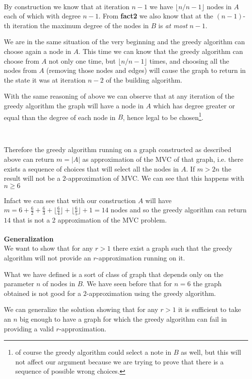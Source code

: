 \documentclass[a4paper]{article}
\begin{document}
\

By construction we know that at iteration $n-1$ we have $\lfloor n/n-1 \rfloor$ nodes in $A$ each of which with degree $n-1$.
From \textbf{fact2} we also know that at the $(n-1)$-th iteration the maximum degree of the nodes in $B$  is \emph{at most} $n-1$.

We are in the same situation of the very beginning and the greedy algorithm can choose again a node in $A$.
This time we can know that the greedy algorithm can choose from $A$ not only one time, but $\lfloor n/n-1 \rfloor$ times, and choosing all the nodes from $A$ (removing those nodes and edges) will cause the graph to return in the state it was at iteration $n-2$ of the building algorithm.

With the same reasoning of above we can observe that at any iteration of the greedy algorithm the graph will have a node in $A$ which has degree greater or equal than the degree of each node in $B$, hence legal to be chosen\footnote{of course the greedy algorithm could select a note in $B$ as well, but this will not affect our argument because we are trying to prove that there is a sequence of possible wrong choices.}.

\

Therefore the greedy algorithm running on a graph constructed as described above can return $m = |A|$ as approximation of the MVC of that graph, i.e. there exists a sequence of choices that will select all the nodes in $A$. 
If $m > 2n$ the result will not be a $2$-approximation of MVC.
We can see that this happens with $n \geq 6$

Infact we can see that with our construction $A$ will have $m = 6 + \frac{6}{2} + \frac{6}{3} + \lfloor \frac{6}{4} \rfloor +   \lfloor \frac{6}{5} \rfloor + 1 = 14$ nodes and so the greedy algorithm can return $14$ that is not a 2 approximation of the MVC problem.
\\
\\
\textbf{Generalization}
\\
We want to show that for any $r>1$ there exist a graph such that the greedy algorithm will not provide an $r$-approximation running on it.

What we have defined is a sort of class of graph that depends only on the parameter $n$ of nodes in $B$.
We have seen before that for $n = 6$ the graph obtained is not good for a $2$-approximation using the greedy algorithm.

We can generalize the solution showing that for any $r > 1$ it is sufficient to take an $n$ big enough to have a graph for which the greedy algorithm can fail in providing a valid $r$-approximation.
\end{document}
